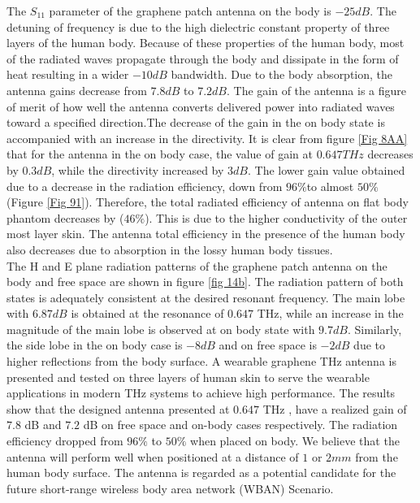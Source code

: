\documentclass[12pt]{suhbook}
\begin{document}
The $S_{11}$ parameter of the graphene patch antenna on the body is $-25 dB$. The detuning of frequency is due to the high dielectric constant property of three layers of the human body. Because of these properties of the human body, most of the radiated waves propagate through the body and dissipate in the form of heat resulting in a wider $-10 dB$ bandwidth. Due to the body absorption, the antenna gains decrease from $7.8 dB$ to $7.2 dB$. The gain of the antenna is a figure of merit of how well the antenna converts delivered power into radiated waves toward a specified direction.The decrease of the gain in the on body state is accompanied with an increase in the directivity. It is clear from figure \ref{Fig 8AA}  that for the antenna in the on body case, the value of gain at $0.647 THz$ decreases by $0.3 dB$, while the directivity increased by $3dB$. The lower gain value obtained due to a decrease in the radiation efficiency, down from $96\% $to almost $50\%$ (Figure \ref{Fig 91}). Therefore, the total radiated efficiency of antenna on flat body phantom decreases by ($46\%$). This is due to the higher conductivity of the outer most layer skin. The antenna total efficiency in the presence of the human body also decreases due to absorption in the lossy human body tissues. 
\\The H and E plane radiation patterns of the graphene patch antenna on the body and free space are shown in figure \ref{fig 14b}. The radiation pattern of both states is adequately consistent at the desired resonant frequency. The main lobe with $6.87 dB$ is obtained at the resonance of $0.647$ THz, while an increase in the magnitude of the main lobe is observed at on body state with $9.7 dB$. Similarly, the side lobe in the on body case is $-8 dB$ and on free space is $-2 dB$ due to higher reflections from the body surface. A wearable graphene THz antenna is presented and tested on three layers of human skin to serve the wearable applications in modern THz systems to achieve high performance. The results show that the designed antenna presented at $0.647$ THz , have a realized gain of $7.8$ dB and $7.2$ dB on free space and on-body cases respectively. The radiation efficiency dropped from $96\%$ to $50\%$ when placed on body. We believe that the antenna will perform well when positioned at a distance of $1$ or $2 mm$ from the human body surface. The antenna is regarded as a potential candidate for the future short-range wireless body area network (WBAN) Scenario.
\end{document}
